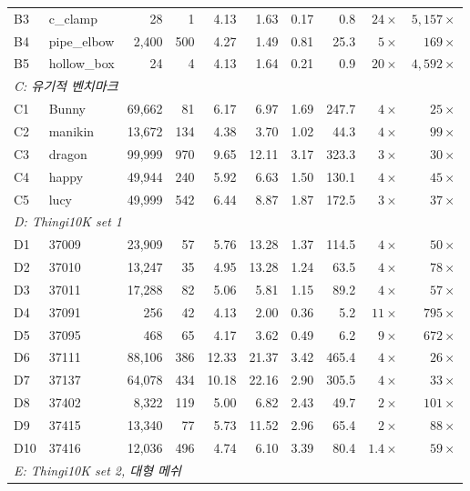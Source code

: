 \documentclass[11pt,a4paper]{article}
\begin{document}
\begin{table}[H]
{\begin{tabular}{llrrrrrrrr}
B3 & c\_clamp     & 28     & 1   & 4.13 & 1.63 & 0.17 & 0.8    & $24\times$  & $5{,}157\times$\\
B4 & pipe\_elbow  & 2{,}400  & 500 & 4.27 & 1.49 & 0.81 & 25.3   & $5\times$   & $169\times$\\
B5 & hollow\_box  & 24     & 4   & 4.13 & 1.64 & 0.21 & 0.9    & $20\times$  & $4{,}592\times$\\
\midrule
\multicolumn{10}{l}{\textit{C: 유기적 벤치마크}}\\
C1 & Bunny       & 69{,}662 & 81  & 6.17  & 6.97  & 1.69 & 247.7 & $4\times$  & $25\times$\\
C2 & manikin     & 13{,}672 & 134 & 4.38  & 3.70  & 1.02 & 44.3  & $4\times$  & $99\times$\\
C3 & dragon      & 99{,}999 & 970 & 9.65  & 12.11 & 3.17 & 323.3 & $3\times$  & $30\times$\\
C4 & happy       & 49{,}944 & 240 & 5.92  & 6.63  & 1.50 & 130.1 & $4\times$  & $45\times$\\
C5 & lucy        & 49{,}999 & 542 & 6.44  & 8.87  & 1.87 & 172.5 & $3\times$  & $37\times$\\
\midrule
\multicolumn{10}{l}{\textit{D: Thingi10K set 1}}\\
D1  & 37009 & 23{,}909 & 57  & 5.76  & 13.28 & 1.37 & 114.5 & $4\times$   & $50\times$\\
D2  & 37010 & 13{,}247 & 35  & 4.95  & 13.28 & 1.24 & 63.5  & $4\times$   & $78\times$\\
D3  & 37011 & 17{,}288 & 82  & 5.06  & 5.81  & 1.15 & 89.2  & $4\times$   & $57\times$\\
D4  & 37091 & 256    & 42  & 4.13  & 2.00  & 0.36 & 5.2   & $11\times$  & $795\times$\\
D5  & 37095 & 468    & 65  & 4.17  & 3.62  & 0.49 & 6.2   & $9\times$   & $672\times$\\
D6  & 37111 & 88{,}106 & 386 & 12.33 & 21.37 & 3.42 & 465.4 & $4\times$   & $26\times$\\
D7  & 37137 & 64{,}078 & 434 & 10.18 & 22.16 & 2.90 & 305.5 & $4\times$   & $33\times$\\
D8  & 37402 & 8{,}322  & 119 & 5.00  & 6.82  & 2.43 & 49.7  & $2\times$   & $101\times$\\
D9  & 37415 & 13{,}340 & 77  & 5.73  & 11.52 & 2.96 & 65.4  & $2\times$   & $88\times$\\
D10 & 37416 & 12{,}036 & 496 & 4.74  & 6.10  & 3.39 & 80.4  & $1.4\times$ & $59\times$\\
\midrule
\multicolumn{10}{l}{\textit{E: Thingi10K set 2, 대형 메쉬}}\\

\end{tabular}}
\end{table}
\end{document}
